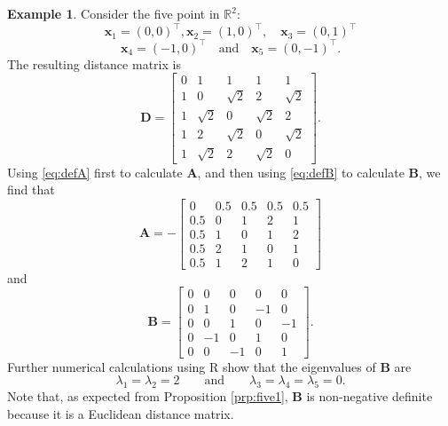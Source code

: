 \documentclass[]{book}
\theoremstyle{definition}
\theoremstyle{definition}
\newtheorem{example}{Example}[chapter]
\theoremstyle{definition}
\theoremstyle{remark}
\begin{document}
\begin{example}
\protect\hypertarget{exm:mdsm1}{}{\label{exm:mdsm1} }Consider the five point in \(\mathbb{R}^2\):
\[
\boldsymbol x_1=(0,0)^\top,  \boldsymbol x_2 =(1,0)^\top, \quad \boldsymbol x_3 =(0,1)^\top
\]
\[
\boldsymbol x_4 =(-1,0)^\top \quad \text{and} \quad \boldsymbol x_5=(0,-1)^\top.
\]
The resulting distance matrix is
\[
\boldsymbol D=\left [ \begin{array}{ccccc}
0&1&1&1&1\\
1&0&\sqrt{2}&2&\sqrt{2}\\
1&\sqrt{2}&0&\sqrt{2}&2\\
1&2&\sqrt{2}&0&\sqrt{2}\\
1&\sqrt{2}&2&\sqrt{2}&0
\end{array} \right ].
\]
Using \eqref{eq:defA} first to calculate \(\boldsymbol A\), and then using \eqref{eq:defB} to calculate \(\boldsymbol B\), we find that
\[
\boldsymbol A=-\left [ \begin{array}{ccccc}
0&0.5&0.5&0.5&0.5\\
0.5&0&1&2&1\\
0.5&1&0&1&2\\
0.5&2&1&0&1\\
0.5&1&2&1&0
\end{array} \right ]
\]
and
\[
\boldsymbol B=\left [ \begin{array}{ccccc}
 0& 0&0&0&0\\
0&1&0&-1&0\\
0&0&1&0&-1\\
0&-1&0&1&0\\
0&0&-1&0&1
\end{array} \right ].
\]
Further numerical calculations using R show that the eigenvalues of \(\boldsymbol B\) are
\[
\lambda_1=\lambda_2=2 \qquad \text{and} \qquad \lambda_3=\lambda_4=\lambda_5=0.
\]
Note that, as expected from Proposition \ref{prp:five1}, \(\boldsymbol B\) is non-negative definite because it is a Euclidean
distance matrix.


\end{example}
\end{document}
